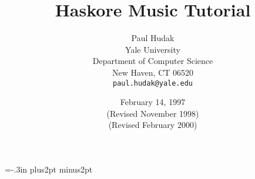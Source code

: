 





\textheight=8.5in
\textwidth=6.5in
\topmargin=-.3in
\oddsidemargin=0in
\evensidemargin=0in
\parskip=6pt plus2pt minus2pt

\newcommand{\extended}[1]{#1}
\newcommand{\basic}[1]{}


\newtheorem{prop}{Proposition}
\newtheorem{axiom}{Axiom}
\newtheorem{theorem}{Theorem}
\newtheorem{exercise}{Exercise}

\newcommand{\ignore}[1]{}
\newcommand{\out}[1]{}



\title{Haskore Music Tutorial}

\author{Paul Hudak\\
Yale University\\
Department of Computer Science\\
New Haven, CT 06520\\
{\tt paul.hudak@yale.edu}}

\date{February 14, 1997\\
(Revised November 1998)\\
(Revised February 2000)}

\maketitle









\basic{}
\extended{}

\basic{}
\extended{}







